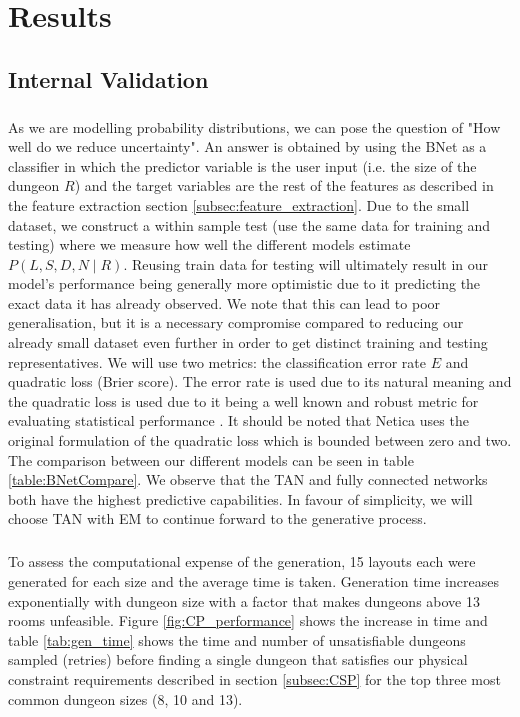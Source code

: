 \documentclass{UoYCSproject}
\begin{document}
\chapter{Results}
\label{cha:results}
\section{Internal Validation}
\paragraph{}
As we are modelling probability distributions, we can pose the question of "How well do we reduce uncertainty". An answer is obtained by using the BNet as a classifier in which the predictor variable is the user input (i.e. the size of the dungeon \(R\)) and the target variables are the rest of the features as described in the feature extraction section \ref{subsec:feature_extraction}.
Due to the small dataset, we construct a within sample test (use the same data for training and testing) where we measure how well the different models estimate \(P(L,S,D,N \mid R)\). Reusing train data for testing will ultimately result in our model's performance being generally more optimistic due to it predicting the exact data it has already observed. We note that this can lead to poor generalisation, but it is a necessary compromise compared to reducing our already small dataset even further in order to get distinct training and testing representatives. We will use two metrics: the classification error rate \(E\) and quadratic loss (Brier score). The error rate is used due to its natural meaning and the quadratic loss is used due to it being a well known and robust metric for evaluating statistical performance \parencite{PearlScoringRules}. It should be noted that Netica uses the original formulation of the quadratic loss which is bounded between zero and two. The comparison between our different models can be seen in table \ref{table:BNetCompare}. We observe that the TAN and fully connected networks both have the highest predictive capabilities. In favour of simplicity, we will choose TAN with EM to continue forward to the generative process.

\paragraph{}
To assess the computational expense of the generation, 15 layouts each were generated for each size and the average time is taken. Generation time increases exponentially with dungeon size with a factor that makes dungeons above 13 rooms unfeasible. Figure \ref{fig:CP_performance} shows the increase in time and table \ref{tab:gen_time} shows the time and number of unsatisfiable dungeons sampled (retries) before finding a single dungeon that satisfies our physical constraint requirements described in section \ref{subsec:CSP} for the top three most common dungeon sizes (8, 10 and 13).
\end{document}
